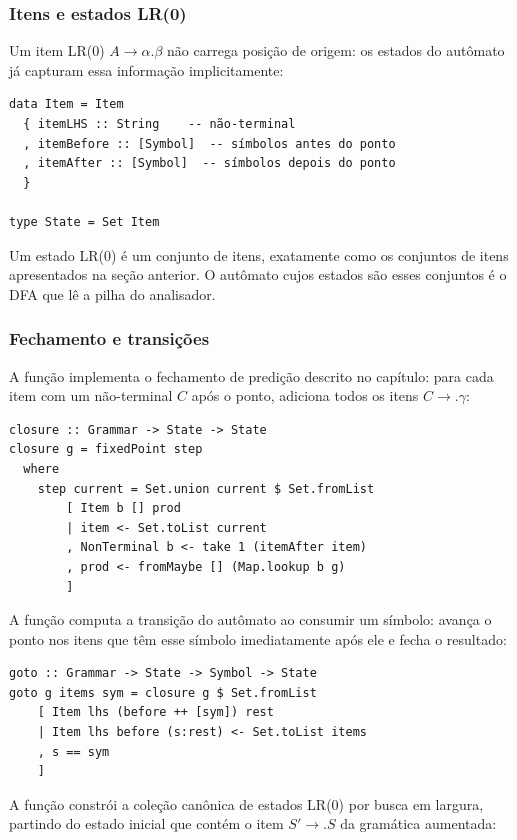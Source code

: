 \subsubsection{Itens e estados LR(0)}

Um item LR(0) \(A \to \alpha . \beta\) não carrega posição de origem: os estados do autômato já capturam essa informação implicitamente:

\begin{verbatim}
data Item = Item
  { itemLHS :: String    -- não-terminal
  , itemBefore :: [Symbol]  -- símbolos antes do ponto
  , itemAfter :: [Symbol]  -- símbolos depois do ponto
  }

type State = Set Item
\end{verbatim}

Um estado LR(0) é um conjunto de itens, exatamente como os conjuntos
de itens apresentados na seção anterior. O autômato cujos estados são
esses conjuntos é o DFA que lê a pilha do analisador.

\subsubsection{Fechamento e transições}

A função  implementa o fechamento de
predição descrito no capítulo: para cada item com um não-terminal
\(C\) após o ponto, adiciona todos os itens \(C \to . \gamma\):

\begin{verbatim}
closure :: Grammar -> State -> State
closure g = fixedPoint step
  where
    step current = Set.union current $ Set.fromList
        [ Item b [] prod
        | item <- Set.toList current
        , NonTerminal b <- take 1 (itemAfter item)
        , prod <- fromMaybe [] (Map.lookup b g)
        ]
\end{verbatim}

A função  computa a transição do
autômato ao consumir um símbolo: avança o ponto nos itens que têm
esse símbolo imediatamente após ele e fecha o resultado:

\begin{verbatim}
goto :: Grammar -> State -> Symbol -> State
goto g items sym = closure g $ Set.fromList
    [ Item lhs (before ++ [sym]) rest
    | Item lhs before (s:rest) <- Set.toList items
    , s == sym
    ]
\end{verbatim}

A função  constrói a coleção
canônica de estados LR(0) por busca em largura, partindo do estado
inicial que contém o item \(S' \to . S\) da gramática aumentada:

